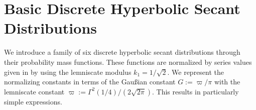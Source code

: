\documentclass[12pt]{amsart}
\theoremstyle{definition}
\theoremstyle{remark}
\numberwithin{equation}{section}
\newcommand{\1}{\mathbbm{1}}
\begin{document}




\section{Basic Discrete Hyperbolic Secant Distributions}

We introduce a family of six discrete hyperbolic secant distributions through their probability mass functions. These functions are normalized by series values given in \cite{ramanujan_1991} by using the lemniscate modulus $k_1 = 1/\sqrt{2}$. We represent the normalizing constants in terms of the Gau\ss ian constant $G:=\varpi/\pi$ with the lemniscate constant $\varpi:=\Gamma^2(1/4)/(2\sqrt{2 \pi})$. This results in particularly simple expressions.
\end{document}

